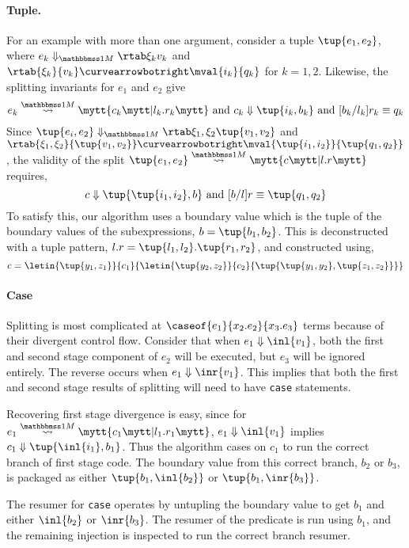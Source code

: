 \begin{abstrsyn}
\paragraph{Tuple.} 
For an example with more than one argument, consider a tuple $\tup{e_1,e_2}$,
where $\diaone {e_k} {\xi_k} {v_k}$ and $\rtab {\xi_k} {v_k} \vsplito \mval {i_k} {q_k}$
for $k = 1,2$.
Likewise, the splitting invariants for $e_1$ and $e_2$ give
\[
	\splitone {e_k} A {c_k} {l_k.r_k} \text{ and } \reduce {c_k} {\tup{i_k,b_k}} \text{ and } [b_k/l_k]r_k \equiv q_k
\]
Since $\diaone {\tup{e_i,e_2}} {\xi_1,\xi_2} {\tup{v_1,v_2}}$ 
and $\rtab {\xi_1,\xi_2} {\tup{v_1,v_2}} \vsplito \mval {\tup{i_1,i_2}} {\tup{q_1,q_2}}$,
the validity of the split $\splitone {\tup{e_1,e_2}} A {c} {l.r}$ requires,
\[
	\reduce {c} {\tup{\tup{i_1,i_2},b}} \text{ and } [b/l]r \equiv \tup{q_1,q_2}
\]
To satisfy this, our algorithm uses a boundary value which is the tuple of the boundary values of the subexpressions,
$b = \tup{b_1,b_2}$. This is deconstructed with a tuple pattern, $l.r = \tup{l_1,l_2}.\tup{r_1,r_2}$,
and constructed using,
\[
c = \letin{\tup{y_1,z_1}}{c_1}{\letin{\tup{y_2,z_2}}{c_2}{\tup{\tup{y_1, y_2},\tup{z_1, z_2}}}}
\]

\paragraph {Case}
Splitting is most complicated at $\caseof {e_1} {x_2.e_2} {x_3.e_3}$ terms because of their divergent control flow.
Consider that when $\reduce {e_1} {\inl {v_1}}$, both the first and second stage component of $e_2$ will be executed, 
but $e_3$ will be ignored entirely. The reverse occurs when $\reduce {e_1} {\inr {v_1}}$.
This implies that both the first and second stage results of splitting will need to have \texttt{case} statements.

Recovering first stage divergence is easy, since for $\splitone {e_1} ? {c_1} {l_1.r_1}$, 
$\reduce {e_1} {\inl {v_1}}$ implies $\reduce {c_1} {\tup{\inl {i_1},b_1}}$.
Thus the algorithm cases on $c_1$ to run the correct branch of first stage code.
The boundary value from this correct branch, $b_2$ or $b_3$, is packaged as either $\tup {b_1, \inl {b_2}}$ or $\tup {b_1, \inr {b_3}}$.

The resumer for \texttt{case} operates by untupling the boundary value to get $b_1$ and either $\inl {b_2}$ or $\inr {b_3}$.
The resumer of the predicate is run using $b_1$, and the remaining injection is inspected to run the correct branch resumer.


\end{abstrsyn}
